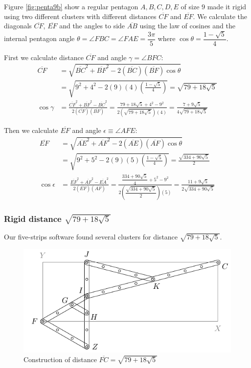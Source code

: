 \documentclass[11pt]{article}
\begin{document}
Figure \ref{fig:penta9b} show a regular pentagon $A,B,C,D,E$ of size $9$ made it rigid using two different clusters with different distances $\overline{CF}$ and $\overline{EF}$. We calculate the diagonals $\overline{CF}$, $\overline{EF}$ and the angles to side $\overline{AB}$ using the law of cosines and the internal pentagon angle $\theta=\angle{FBC}=\angle{FAE}=\dfrac{3\pi}5$ where $\cos\theta = \dfrac{1-\sqrt5}4$. 

First we calculate distance $\overline{CF}$ and angle $\gamma = \angle{BFC}$:
\begin{align}
\overline{CF} &= \sqrt{
 \overline{BC}^2 + \overline{BF}^2 - 2(\overline{BC})(\overline{BF})\cos\theta } \nonumber\\
 &= \sqrt{9^2 + 4^2 - 2(9)(4)\left(\frac{1-\sqrt5}4\right)} = \sqrt{79 + 18\sqrt5}\\
%
\cos\gamma &= 
 \frac{\overline{CF}^2 + \overline{BF}^2 - \overline{BC}^2}{2(\overline{CF})(\overline{BF})}
 = \frac{79 + 18\sqrt5 + 4^2 - 9^2}{2(\sqrt{79 + 18\sqrt5})(4)}
 = \frac{7 + 9\sqrt5}{4\sqrt{79 + 18\sqrt5}}
\end{align}

Then we calculate $\overline{EF}$ and angle $\epsilon \equiv \angle{AFE}$:
\begin{align}
\overline{EF} &= \sqrt{
 \overline{AE}^2 + \overline{AF}^2 - 2(\overline{AE})(\overline{AF})\cos\theta} \nonumber\\
 &= \sqrt{9^2 + 5^2 - 2(9)(5)\left(\frac{1-\sqrt5}4\right)} = \frac{\sqrt{334 + 90\sqrt5}}2\\
%
\cos\epsilon &=
 \frac{\overline{EF}^2 + \overline{AF}^2 - \overline{EA}^2}{2(\overline{EF})(\overline{AF})}
 = \frac{\dfrac{334 + 90\sqrt5}4 + 5^2 - 9^2 }{2\left(\dfrac{\sqrt{334 + 90\sqrt5}}2\right)(5)}
 = \frac{11 + 9\sqrt5}{2\sqrt{334 + 90\sqrt5}}
\end{align}

\subsubsection{Rigid distance $\sqrt{79 + 18\sqrt5}$}

Our five-strips software found several clusters for distance $\sqrt{79 + 18\sqrt5}$.

\begin{figure}[h]
\centering
\includegraphics[scale=1]{9/cluster9b1}
\caption{Construction of distance $\overline{FC}=\sqrt{79 + 18\sqrt5}$}
\label{fig:cluster9b1}
\end{figure}
\end{document}
